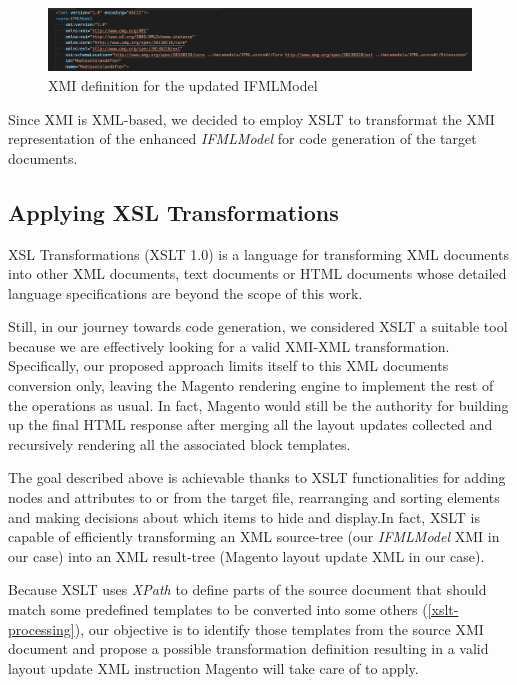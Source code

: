 \vspace{0.5cm}
\begin{figure}[H]
  \centering
    \includegraphics[width=15cm]{images/xmi-header.png}
  \caption{XMI definition for the updated IFMLModel}
  \label{fig:xmi-header}
\end{figure}
\vspace{0.5cm}


Since XMI is XML-based, we decided to employ XSLT to transformat the XMI representation of the enhanced \textit{IFMLModel} for code generation of the target documents. 

\subsection{Applying XSL Transformations}

XSL Transformations (XSLT 1.0) is a language for transforming XML documents into other XML documents, text documents or HTML documents\cite{xslt} whose detailed language specifications are beyond the scope of this work.

Still, in our journey towards code generation, we considered XSLT a suitable tool because we are effectively looking for a valid XMI-XML transformation. Specifically, our proposed approach limits itself to this XML documents conversion only, leaving the Magento rendering engine to implement the rest of the operations as usual. In fact, Magento would still be the authority for building up the final HTML response after merging all the layout updates collected and recursively rendering all the associated block templates.

The goal described above is achievable thanks to XSLT functionalities for adding nodes and attributes to or from the target file, rearranging and sorting elements and making decisions about which items to hide and display.In fact, XSLT is capable of efficiently transforming an XML source-tree (our \textit{IFMLModel} XMI in our case) into an XML result-tree (Magento layout update XML in our case).

Because XSLT uses \textit{XPath} to define parts of the source document that should match some predefined templates to be converted into some others (\ref{xslt-processing}), our objective is to identify those templates from the source XMI document and propose a possible transformation definition resulting in a valid layout update XML instruction Magento will take care of to apply.

